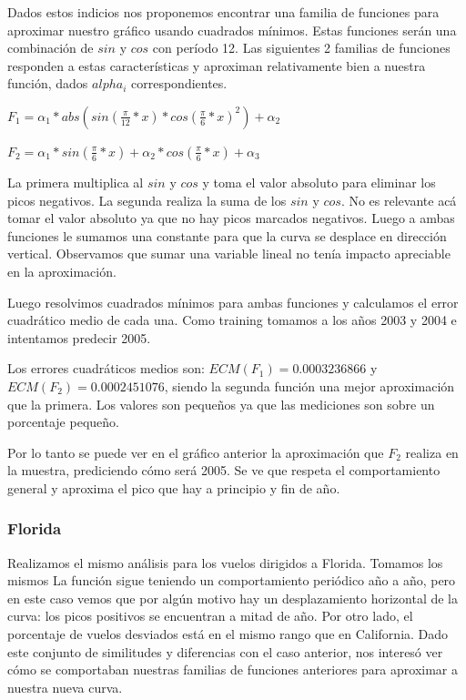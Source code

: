 Dados estos indicios nos proponemos encontrar una familia de funciones para aproximar nuestro gr\'afico usando cuadrados m\'inimos. Estas funciones ser\'an una combinaci\'on de $sin$ y $cos$ con per\'iodo 12. Las siguientes 2 familias de funciones responden a estas caracter\'isticas y aproximan relativamente bien a nuestra funci\'on, dados $alpha_i$ correspondientes.


$F_1 = \alpha_1 * abs(sin(\frac{\pi}{12}*x) * cos(\frac{\pi}{6}*x)^2) + \alpha_2$

$F_2 = \alpha_1 * sin(\frac{\pi}{6}*x) + \alpha_2 * cos(\frac{\pi}{6}*x) + \alpha_3$


La primera multiplica al $sin$ y $cos$ y toma el valor absoluto para eliminar los picos negativos. La segunda realiza la suma de los $sin$ y $cos$. No es relevante ac\'a tomar el valor absoluto ya que no hay picos marcados negativos. Luego a ambas funciones le sumamos una constante para que la curva se desplace en direcci\'on vertical. Observamos que sumar una variable lineal no ten\'ia impacto apreciable en la aproximaci\'on. 

Luego resolvimos cuadrados m\'inimos para ambas funciones y calculamos el error cuadr\'atico medio de cada una. Como training tomamos a los a\~nos 2003 y 2004 e intentamos predecir 2005.

Los errores cuadr\'aticos medios son: $ECM(F_1) = 0.0003236866$ y $ECM(F_2) = 0.0002451076$, siendo la segunda funci\'on una mejor aproximaci\'on que la primera. Los valores son peque\~nos ya que las mediciones son sobre un porcentaje peque\~no.

Por lo tanto se puede ver en el gr\'afico anterior la aproximaci\'on que $F_2$ realiza en la muestra, prediciendo c\'omo ser\'a 2005. Se ve que respeta el comportamiento general y aproxima el pico que hay a principio y fin de a\~no.

\subsubsection{Florida}

Realizamos el mismo an\'alisis para los vuelos dirigidos a Florida. Tomamos los mismos 
La funci\'on sigue teniendo un comportamiento peri\'odico a\~no a a\~no, pero en este caso vemos que por alg\'un motivo hay un desplazamiento horizontal de la curva: los picos positivos se encuentran a mitad de a\~no.
Por otro lado, el porcentaje de vuelos desviados est\'a en el mismo rango que en California.
Dado este conjunto de similitudes y diferencias con el caso anterior, nos interes\'o ver c\'omo se comportaban nuestras familias de funciones anteriores para aproximar a nuestra nueva curva.

